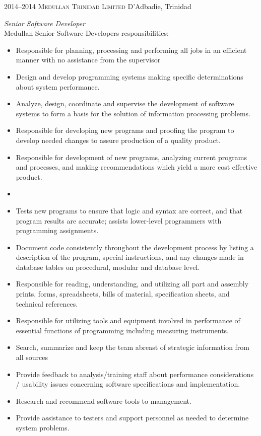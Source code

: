 \documentclass[]{friggeri-cv} %
\begin{document}
\begin{entrylist}
\entry
{2014--2014}
{\textsc{Medullan Trinidad Limited}}
{D'Adbadie, Trinidad}
{\emph{Senior Software Developer} \\
Medullan Senior Software Developers responsibilities: \\
\begin{itemize}
\item Responsible for planning, processing and performing all jobs in an efficient manner with no assistance from the supervisor
\item Design and develop programming systems making specific determinations about system performance.
\item Analyze, design, coordinate and supervise the development of software systems to form a basis for the solution of information processing problems.
\item Responsible for developing new programs and proofing the program to develop needed changes to assure production of a quality product.
\item Responsible for development of new programs, analyzing current programs and processes, and making recommendations which yield a more cost effective product.
\item 
\item Tests new programs to ensure that logic and syntax are correct, and that program results are accurate; assists lower-level programmers with programming assignments.
\item Document code consistently throughout the development process by listing a description of the program, special instructions, and any changes made in database tables on procedural, modular and database level.
\item Responsible for reading, understanding, and utilizing all part and assembly prints, forms, spreadsheets, bills of material, specification sheets, and technical references.
\item Responsible for utilizing tools and equipment involved in performance of essential functions of programming including measuring instruments.
\item Search, summarize and keep the team abreast of strategic information from all sources
\item Provide feedback to analysis/training staff about performance considerations / usability issues concerning software specifications and implementation.
\item Research and recommend software tools to management.
\item Provide assistance to testers and support personnel as needed to determine system problems.
\end{itemize}}
\end{entrylist}
\end{document}
